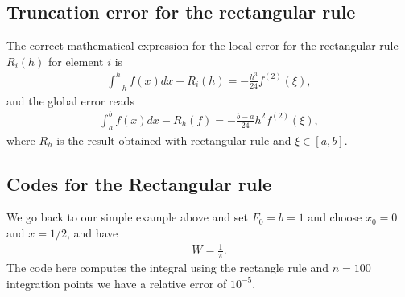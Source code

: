 \documentclass[letterpaper,10pt,english]{sphinxmanual}
\begin{document}
\subsection{Truncation error for the rectangular rule}
\label{\detokenize{chapter3:truncation-error-for-the-rectangular-rule}}
The correct mathematical expression for the local error for the rectangular rule \(R_i(h)\) for element \(i\) is
\begin{equation*}
\begin{split}
\int_{-h}^hf(x)dx - R_i(h)=-\frac{h^3}{24}f^{(2)}(\xi),
\end{split}
\end{equation*}
and the global error reads
\begin{equation*}
\begin{split}
\int_a^bf(x)dx -R_h(f)=-\frac{b-a}{24}h^2f^{(2)}(\xi),
\end{split}
\end{equation*}
where \(R_h\) is the result obtained with rectangular rule and \(\xi \in [a,b]\).


\subsection{Codes for the Rectangular rule}
\label{\detokenize{chapter3:codes-for-the-rectangular-rule}}
We go back to our simple example above and set \(F_0=b=1\) and choose \(x_0=0\) and \(x=1/2\), and have
\begin{equation*}
\begin{split}
W=\frac{1}{\pi}.
\end{split}
\end{equation*}
The code here computes the integral using the rectangle rule and \(n=100\) integration points we have a relative error of
\(10^{-5}\).
\end{document}
